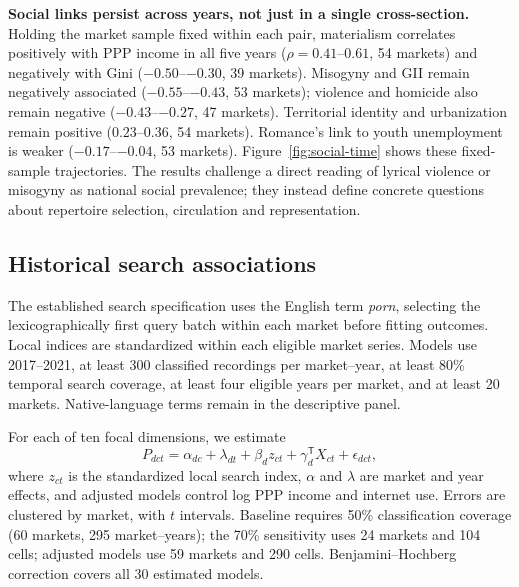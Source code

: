 \documentclass[10pt,a4paper,twocolumn]{article}
\begin{document}
\textbf{Social links persist across years, not just in a single cross-section.} Holding the market sample fixed within each pair, materialism correlates positively with PPP income in all five years ($\rho=0.41$--$0.61$, 54 markets) and negatively with Gini ($-0.50$--$-0.30$, 39 markets). Misogyny and GII remain negatively associated ($-0.55$--$-0.43$, 53 markets); violence and homicide also remain negative ($-0.43$--$-0.27$, 47 markets). Territorial identity and urbanization remain positive ($0.23$--$0.36$, 54 markets). Romance's link to youth unemployment is weaker ($-0.17$--$-0.04$, 53 markets). Figure~\ref{fig:social-time} shows these fixed-sample trajectories. The results challenge a direct reading of lyrical violence or misogyny as national social prevalence; they instead define concrete questions about repertoire selection, circulation and representation.

\subsection{Historical search associations}
The established search specification uses the English term \textit{porn}, selecting the lexicographically first query batch within each market before fitting outcomes. Local indices are standardized within each eligible market series. Models use 2017--2021, at least 300 classified recordings per market--year, at least 80\% temporal search coverage, at least four eligible years per market, and at least 20 markets. Native-language terms remain in the descriptive panel.

For each of ten focal dimensions, we estimate
\begin{equation}
 P_{dct}=\alpha_{dc}+\lambda_{dt}+\beta_d z_{ct}+\gamma_d^{\mathsf T}X_{ct}+\epsilon_{dct},
\end{equation}
where $z_{ct}$ is the standardized local search index, $\alpha$ and $\lambda$ are market and year effects, and adjusted models control log PPP income and internet use. Errors are clustered by market, with $t$ intervals. Baseline requires 50\% classification coverage (60 markets, 295 market--years); the 70\% sensitivity uses 24 markets and 104 cells; adjusted models use 59 markets and 290 cells. Benjamini--Hochberg correction covers all 30 estimated models.
\end{document}
